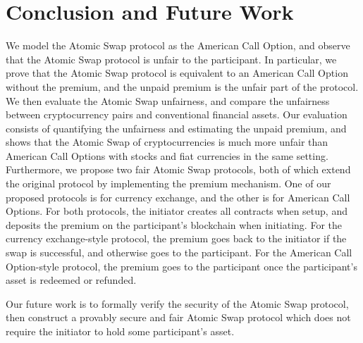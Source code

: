 \section{Conclusion and Future Work}
\label{sec:conclusion}


We model the Atomic Swap protocol as the American Call Option,
and observe that the Atomic Swap protocol is unfair to the participant.
In particular, we prove that the Atomic Swap protocol is equivalent to an American Call Option without the premium,
and the unpaid premium is the unfair part of the protocol.
We then evaluate the Atomic Swap unfairness, and compare the unfairness between cryptocurrency pairs and conventional financial assets.
Our evaluation consists of quantifying the unfairness and estimating the unpaid premium,
and shows that the Atomic Swap of cryptocurrencies is much more unfair than American Call Options with stocks and fiat currencies in the same setting.
Furthermore, we propose two fair Atomic Swap protocols, both of which extend the original protocol by implementing the premium mechanism.
One of our proposed protocols is for currency exchange, and the other is for American Call Options.
For both protocols, the initiator creates all contracts when setup, and deposits the premium on the participant's blockchain when initiating.
For the currency exchange-style protocol, the premium goes back to the initiator if the swap is successful, and otherwise goes to the participant.
For the American Call Option-style protocol, the premium goes to the participant once the participant's asset is redeemed or refunded.

Our future work is to formally verify the security of the Atomic Swap protocol,
then construct a provably secure and fair Atomic Swap protocol which does not require the initiator to hold some participant's asset.
